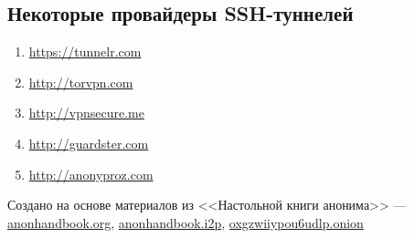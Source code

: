 \subsection*{Некоторые провайдеры SSH-туннелей}
\begin{enumerate}
\item \url{https://tunnelr.com}
\item \url{http://torvpn.com}
\item \url{http://vpnsecure.me}
\item \url{http://guardster.com}
\item \url{http://anonyproz.com}
\end{enumerate}
\vfill
\scriptsize Создано на основе материалов из <<Настольной книги анонима>> --- \url{anonhandbook.org}, \url{anonhandbook.i2p}, \url{oxgzwiiypou6udlp.onion}
\normalsize
